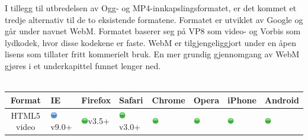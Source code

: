 I tillegg til utbredelsen av Ogg- og MP4-innkapslingsformatet, er det kommet et tredje alternativ til de to eksistende formatene. Formatet er utviklet av Google og går under navnet WebM. Formatet baserer seg på VP8 som video- og Vorbis som lydkodek, hvor disse kodekene er faste. WebM er tilgjengeliggjort under en åpen lisens som tillater fritt kommerielt bruk. En mer grundig gjennomgang av WebM gjøres i et underkapittel funnet lenger ned.\\\\
%
\begin{tabular}{| c | l | l | l | l | l | l | l |}
  \hline
  \textbf{Format} & \textbf{IE} & \textbf{Firefox} & \textbf{Safari} & \textbf{Chrome} & \textbf{Opera} & \textbf{iPhone} & \textbf{Android} \\ \hline
  HTML5 video & \parbox[c]{1em}{\includegraphics[width=3mm]{img/icon-ball-blue.png}}\scriptsize{v9.0+} & \parbox[c]{1em}{\includegraphics[width=3mm]{img/icon-ball-green.png}}\scriptsize{v3.5+} & \parbox[c]{1em}{\includegraphics[width=3mm]{img/icon-ball-green.png}}\scriptsize{v3.0+} & \parbox[c]{1em}{\includegraphics[width=3mm]{img/icon-ball-green.png}} & \parbox[c]{1em}{\includegraphics[width=3mm]{img/icon-ball-green.png}} & \parbox[c]{1em}{\includegraphics[width=3mm]{img/icon-ball-green.png}} & \parbox[c]{1em}{\includegraphics[width=3mm]{img/icon-ball-green.png}} \\ \hline


\end{tabular}
